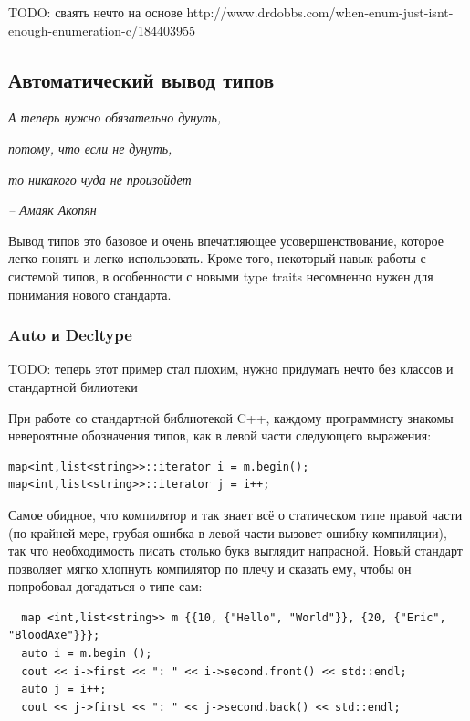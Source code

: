 \documentclass[a4paper,12pt,oneside]{article}
\begin{document}
TODO: сваять нечто на основе http://www.drdobbs.com/when-enum-just-isnt-enough-enumeration-c/184403955

\pagebreak
\subsection{Автоматический вывод типов}

\hfill\textit{А теперь нужно обязательно дунуть,}

\hfill\textit{потому, что если не дунуть,}

\hfill\textit{то никакого чуда не произойдет}{\vspace{0.5em}}

\hfill\textit{-- Амаяк Акопян}

Вывод типов это базовое и очень впечатляющее усовершенствование, которое легко понять и легко использовать. Кроме того, некоторый навык работы с системой типов, в особенности с новыми type traits несомненно нужен для понимания нового стандарта.

\subsubsection{Auto и Decltype}\label{DecltypeAuto}

TODO: теперь этот пример стал плохим, нужно придумать нечто без классов и стандартной билиотеки

При работе со стандартной библиотекой C++, каждому программисту знакомы невероятные обозначения типов, как в левой части следующего выражения:

\begin{lstlisting}
map<int,list<string>>::iterator i = m.begin(); 
map<int,list<string>>::iterator j = i++; 
\end{lstlisting}

Самое обидное, что компилятор и так знает всё о статическом типе правой части (по крайней мере, грубая ошибка в левой части вызовет ошибку компиляции), так что необходимость писать столько букв выглядит напрасной. Новый стандарт позволяет мягко хлопнуть компилятор по плечу и сказать ему, чтобы он попробовал догадаться о типе сам:

\begin{lstlisting}
  map <int,list<string>> m {{10, {"Hello", "World"}}, {20, {"Eric", "BloodAxe"}}};
  auto i = m.begin ();
  cout << i->first << ": " << i->second.front() << std::endl;
  auto j = i++;
  cout << j->first << ": " << j->second.back() << std::endl;
\end{lstlisting}
\end{document}
